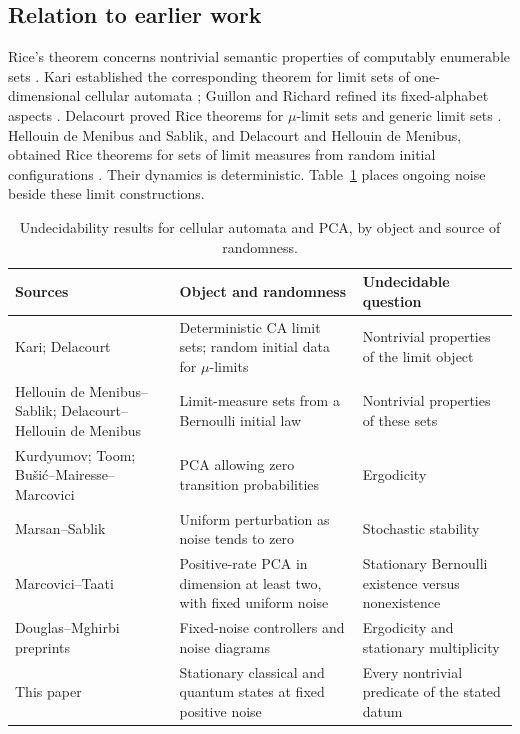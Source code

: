 \subsection{Relation to earlier work}
Rice's theorem concerns nontrivial semantic properties of computably enumerable sets \cite{rice}. Kari established the corresponding theorem for limit sets of one-dimensional cellular automata \cite{kari-rice}; Guillon and Richard refined its fixed-alphabet aspects \cite{guillon-richard}. Delacourt proved Rice theorems for $\mu$-limit sets and generic limit sets \cite{delacourt,delacourt-generic}. Hellouin de Menibus and Sablik, and Delacourt and Hellouin de Menibus, obtained Rice theorems for sets of limit measures from random initial configurations \cite{hellouin-sablik,delacourt-hellouin}. Their dynamics is deterministic. Table~\ref{tab:landscape} places ongoing noise beside these limit constructions.

\begin{table}[ht]
\centering\small
\begin{tabularx}{\textwidth}{@{}>{\raggedright\arraybackslash}p{3.6cm}>{\raggedright\arraybackslash}X>{\raggedright\arraybackslash}X@{}}\toprule
Sources & Object and randomness & Undecidable question\\\midrule
Kari; Delacourt & Deterministic CA limit sets; random initial data for $\mu$-limits & Nontrivial properties of the limit object\\
Hellouin de Menibus--Sablik; Delacourt--Hellouin de Menibus & Limit-measure sets from a Bernoulli initial law & Nontrivial properties of these sets\\
Kurdyumov; Toom; Bu\v{s}i\'c--Mairesse--Marcovici & PCA allowing zero transition probabilities & Ergodicity\\
Marsan--Sablik & Uniform perturbation as noise tends to zero & Stochastic stability\\
Marcovici--Taati & Positive-rate PCA in dimension at least two, with fixed uniform noise & Stationary Bernoulli existence versus nonexistence\\
Douglas--Mghirbi preprints & Fixed-noise controllers and noise diagrams & Ergodicity and stationary multiplicity\\
This paper & Stationary classical and quantum states at fixed positive noise & Every nontrivial predicate of the stated datum\\\bottomrule
\end{tabularx}
\caption{Undecidability results for cellular automata and PCA, by object and source of randomness.}\label{tab:landscape}
\end{table}

